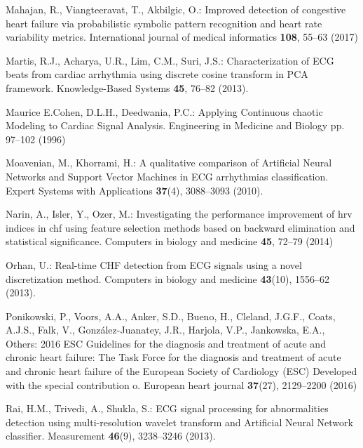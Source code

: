 \documentclass[twocolumn]{svjour3}
\begin{document}
\begin{thebibliography}{10}
Mahajan, R., Viangteeravat, T., Akbilgic, O.: Improved detection of congestive
  heart failure via probabilistic symbolic pattern recognition and heart rate
  variability metrics.
\newblock International journal of medical informatics \textbf{108}, 55--63
  (2017)

Martis, R.J., Acharya, U.R., Lim, C.M., Suri, J.S.: {Characterization of ECG
  beats from cardiac arrhythmia using discrete cosine transform in PCA
  framework}.
\newblock Knowledge-Based Systems \textbf{45}, 76--82 (2013).
\newblock {}

{Maurice E.Cohen}, D.L.H., Deedwania, P.C.: {Applying Continuous chaotic
  Modeling to Cardiac Signal Analysis}.
\newblock Engineering in Medicine and Biology pp. 97--102 (1996)

Moavenian, M., Khorrami, H.: {A qualitative comparison of Artificial Neural
  Networks and Support Vector Machines in ECG arrhythmias classification}.
\newblock Expert Systems with Applications \textbf{37}(4), 3088--3093 (2010).
\newblock {}

Narin, A., Isler, Y., Ozer, M.: Investigating the performance improvement of
  hrv indices in chf using feature selection methods based on backward
  elimination and statistical significance.
\newblock Computers in biology and medicine \textbf{45}, 72--79 (2014)

Orhan, U.: {Real-time CHF detection from ECG signals using a novel
  discretization method.}
\newblock Computers in biology and medicine \textbf{43}(10), 1556--62 (2013).
\newblock {}

Ponikowski, P., Voors, A.A., Anker, S.D., Bueno, H., Cleland, J.G.F., Coats,
  A.J.S., Falk, V., Gonz{\'{a}}lez-Juanatey, J.R., Harjola, V.P., Jankowska,
  E.A., Others: {2016 ESC Guidelines for the diagnosis and treatment of acute
  and chronic heart failure: The Task Force for the diagnosis and treatment of
  acute and chronic heart failure of the European Society of Cardiology (ESC)
  Developed with the special contribution o}.
\newblock European heart journal \textbf{37}(27), 2129--2200 (2016)

Rai, H.M., Trivedi, A., Shukla, S.: {ECG signal processing for abnormalities
  detection using multi-resolution wavelet transform and Artificial Neural
  Network classifier}.
\newblock Measurement \textbf{46}(9), 3238--3246 (2013).
\newblock {}


\end{thebibliography}
\end{document}
